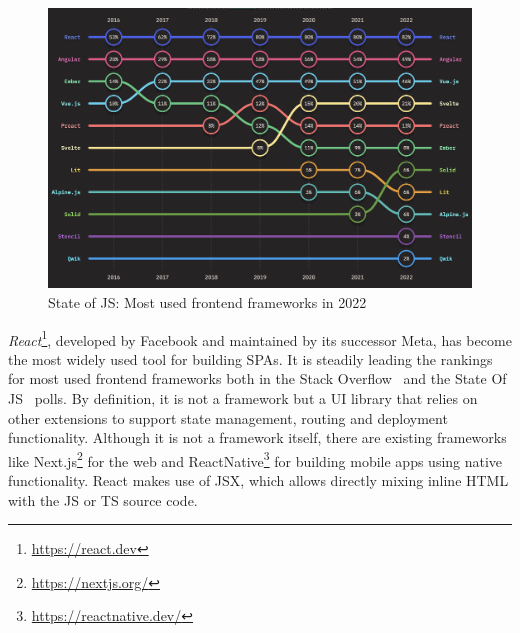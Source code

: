 \begin{figure}[h]
    \centering
    \includegraphics[scale=0.4]{04_Artefakte/01_Abbildungen/stateofjs-usage-frontend-frameworks-2022}
    \caption[Most used frontend frameworks in 2022]{State of JS: Most used frontend frameworks in 2022 \parencite{mostUsedFrontendFrameworks22}\protect}
    \label{fig:mostUsedFrameworks}
\end{figure}

\emph{React}\footnote{\url{https://react.dev}}, developed by Facebook and maintained by its successor Meta, has become the most widely used tool for building \ac{SPA}s.
It is steadily leading the rankings for most used frontend frameworks both in the Stack Overflow~\parencite{stackOverflowPollWebFrameworks23} and the State Of JS~\parencite{mostUsedFrontendFrameworks22} polls.
By definition, it is not a framework but a \ac{UI} library that relies on other extensions to support state management, routing and deployment functionality.
Although it is not a framework itself, there are existing frameworks like Next.js\footnote{\url{https://nextjs.org/}} for the web and ReactNative\footnote{\url{https://reactnative.dev/}} for building mobile apps using native functionality.
React makes use of \ac{JSX}, which allows directly mixing inline \ac{HTML} with the \ac{JS} or \ac{TS} source code.

